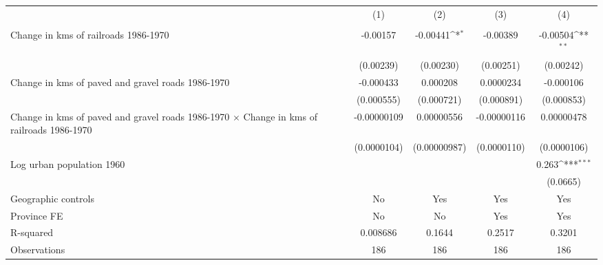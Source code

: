 {
\def\sym#1{\ifmmode^{#1}\else\(^{#1}\)\fi}
\begin{tabular}{l*{4}{c}}
\hline\hline
                &\multicolumn{1}{c}{(1)}&\multicolumn{1}{c}{(2)}&\multicolumn{1}{c}{(3)}&\multicolumn{1}{c}{(4)}\\
                &\multicolumn{1}{c}{}&\multicolumn{1}{c}{}&\multicolumn{1}{c}{}&\multicolumn{1}{c}{}\\
\hline
Change in kms of railroads 1986-1970& -0.00157         & -0.00441\sym{*}  & -0.00389         & -0.00504\sym{**} \\
                &(0.00239)         &(0.00230)         &(0.00251)         &(0.00242)         \\
[1em]
Change in kms of paved and gravel roads 1986-1970&-0.000433         & 0.000208         &0.0000234         &-0.000106         \\
                &(0.000555)         &(0.000721)         &(0.000891)         &(0.000853)         \\
[1em]
Change in kms of paved and gravel roads 1986-1970 $\times$ Change in kms of railroads 1986-1970&-0.00000109         &0.00000556         &-0.00000116         &0.00000478         \\
                &(0.0000104)         &(0.00000987)         &(0.0000110)         &(0.0000106)         \\
[1em]
Log urban population 1960&                  &                  &                  &    0.263\sym{***}\\
                &                  &                  &                  & (0.0665)         \\
\hline
Geographic controls&       No         &      Yes         &      Yes         &      Yes         \\
Province FE     &       No         &       No         &      Yes         &      Yes         \\
R-squared       & 0.008686         &   0.1644         &   0.2517         &   0.3201         \\
Observations    &      186         &      186         &      186         &      186         \\
\hline\hline
\end{tabular}
}
